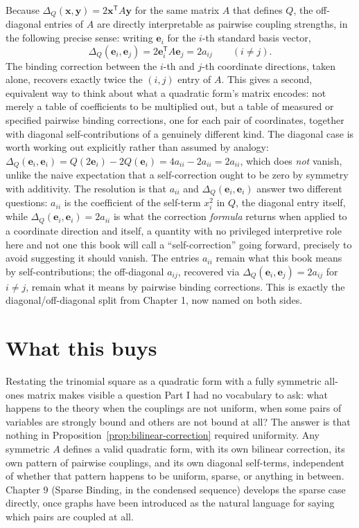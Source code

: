 \documentclass[11pt]{book}
\begin{document}
Because $\Delta_Q(\mathbf{x},\mathbf{y})=2\mathbf{x}^{\mathsf T}A\mathbf{y}$ for the same matrix $A$ that defines $Q$, the off-diagonal entries of $A$ are directly interpretable as pairwise coupling strengths, in the following precise sense: writing $\mathbf{e}_i$ for the $i$-th standard basis vector,
\[
\Delta_Q(\mathbf{e}_i,\mathbf{e}_j) = 2\mathbf{e}_i^{\mathsf T}A\mathbf{e}_j = 2a_{ij} \qquad (i\ne j).
\]
The binding correction between the $i$-th and $j$-th coordinate directions, taken alone, recovers exactly twice the $(i,j)$ entry of $A$. This gives a second, equivalent way to think about what a quadratic form's matrix encodes: not merely a table of coefficients to be multiplied out, but a table of measured or specified pairwise binding corrections, one for each pair of coordinates, together with diagonal self-contributions of a genuinely different kind. The diagonal case is worth working out explicitly rather than assumed by analogy: $\Delta_Q(\mathbf{e}_i,\mathbf{e}_i)=Q(2\mathbf{e}_i)-2Q(\mathbf{e}_i)=4a_{ii}-2a_{ii}=2a_{ii}$, which does \emph{not} vanish, unlike the naive expectation that a self-correction ought to be zero by symmetry with additivity. The resolution is that $a_{ii}$ and $\Delta_Q(\mathbf{e}_i,\mathbf{e}_i)$ answer two different questions: $a_{ii}$ is the coefficient of the self-term $x_i^2$ in $Q$, the diagonal entry itself, while $\Delta_Q(\mathbf{e}_i,\mathbf{e}_i)=2a_{ii}$ is what the correction \emph{formula} returns when applied to a coordinate direction and itself, a quantity with no privileged interpretive role here and not one this book will call a ``self-correction'' going forward, precisely to avoid suggesting it should vanish. The entries $a_{ii}$ remain what this book means by self-contributions; the off-diagonal $a_{ij}$, recovered via $\Delta_Q(\mathbf{e}_i,\mathbf{e}_j)=2a_{ij}$ for $i\ne j$, remain what it means by pairwise binding corrections. This is exactly the diagonal/off-diagonal split from Chapter 1, now named on both sides.

\section{What this buys}

Restating the trinomial square as a quadratic form with a fully symmetric all-ones matrix makes visible a question Part I had no vocabulary to ask: what happens to the theory when the couplings are not uniform, when some pairs of variables are strongly bound and others are not bound at all? The answer is that nothing in Proposition~\ref{prop:bilinear-correction} required uniformity. Any symmetric $A$ defines a valid quadratic form, with its own bilinear correction, its own pattern of pairwise couplings, and its own diagonal self-terms, independent of whether that pattern happens to be uniform, sparse, or anything in between. Chapter 9 (Sparse Binding, in the condensed sequence) develops the sparse case directly, once graphs have been introduced as the natural language for saying which pairs are coupled at all.
\end{document}
